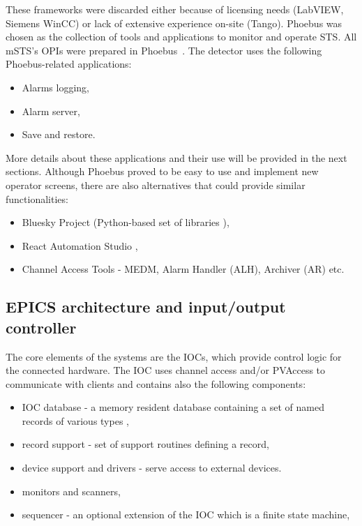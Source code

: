 These frameworks were discarded either because of licensing needs (LabVIEW, Siemens WinCC) or lack of extensive experience on-site (Tango). Phoebus \cite{Phoebus} was chosen as the collection of tools and applications to monitor and operate \gls{STS}. All \gls{mSTS}'s \glspl{OPI} were prepared in Phoebus~\cite{Phoebus}. The detector uses the following Phoebus-related applications:
\begin{itemize}
    \item Alarms logging,
    \item Alarm server,
    \item Save and restore.
\end{itemize}
More details about these applications and their use will be provided in the next sections. Although Phoebus proved to be easy to use and implement new operator screens, there are also alternatives that could provide similar functionalities:
\begin{itemize}
    \item Bluesky Project (Python-based set of libraries \cite{Bluesky}),
    \item React Automation Studio \cite{React},
    \item Channel Access Tools - MEDM, Alarm Handler (\gls{ALH}), Archiver (\gls{AR}) etc. 
\end{itemize}

\subsection{EPICS architecture and input/output controller}
The core elements of the systems are the \glspl{IOC}, which provide control logic for the connected hardware. The \gls{IOC} uses channel access and/or PVAccess to communicate with clients and contains also the following components\cite{IOC}:
\begin{itemize}
    \item \gls{IOC} database -  a memory resident database containing a set of named records of various types \cite{IOC2},
    \item record support - set of support routines defining a record,
    \item device support and drivers - serve access to external devices.
    \item monitors and scanners,
    \item sequencer - an optional extension of the \gls{IOC} which is a finite state machine,
\end{itemize}

